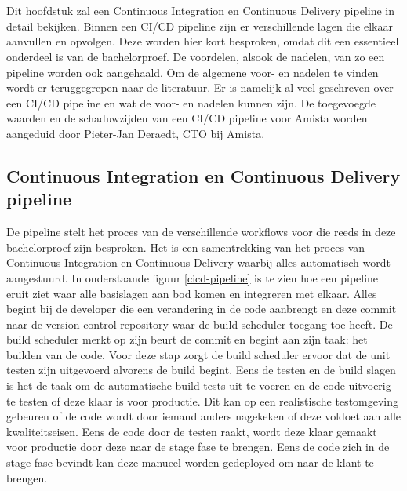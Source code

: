 
\chapter{}
\label{ch:cicd-pipeline}
Dit hoofdstuk zal een Continuous Integration en Continuous Delivery pipeline in detail bekijken. Binnen een CI/CD pipeline zijn er verschillende lagen die elkaar aanvullen en opvolgen. Deze worden hier kort besproken, omdat dit een essentieel onderdeel is van de bachelorproef. De voordelen, alsook de nadelen, van zo een pipeline worden ook aangehaald. Om de algemene voor- en nadelen te vinden wordt er teruggegrepen naar de literatuur. Er is namelijk al veel geschreven over een CI/CD pipeline en wat de voor- en nadelen kunnen zijn. De toegevoegde waarden en de schaduwzijden van een CI/CD pipeline voor Amista worden aangeduid door Pieter-Jan Deraedt, CTO bij Amista.

    \section{Continuous Integration en Continuous Delivery pipeline}
    De pipeline stelt het proces van de verschillende workflows voor die reeds in deze bachelorproef zijn besproken. Het is een samentrekking van het proces van Continuous Integration en Continuous Delivery waarbij alles automatisch wordt aangestuurd. In onderstaande figuur \ref{cicd-pipeline} is te zien hoe een pipeline eruit ziet waar alle basislagen aan bod komen en integreren met elkaar.
    Alles begint bij de developer die een verandering in de code aanbrengt en deze commit naar de version control repository waar de build scheduler toegang toe heeft. De build scheduler merkt op zijn beurt de commit en begint aan zijn taak: het builden van de code. Voor deze stap zorgt de build scheduler ervoor dat de unit testen zijn uitgevoerd alvorens de build begint. Eens de testen en de build slagen is het de taak om de automatische build tests uit te voeren en de code uitvoerig te testen of deze klaar is voor productie. Dit kan op een realistische testomgeving gebeuren of de code wordt door iemand anders nagekeken of deze voldoet aan alle kwaliteitseisen. Eens de code door de testen raakt, wordt deze klaar gemaakt voor productie door deze naar de stage fase te brengen. Eens de code zich in de stage fase bevindt kan deze manueel worden gedeployed om naar de klant te brengen.
    

